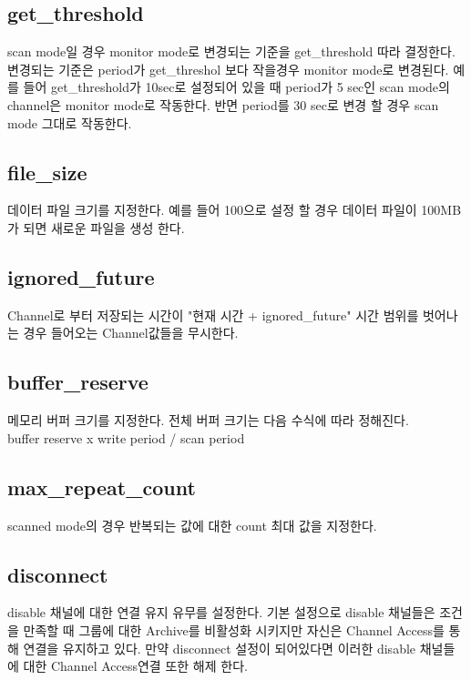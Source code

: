 \documentclass[11pt
  , a4paper
  , article
  , oneside
]{memoir}
\begin{document}
\subsection{get\_threshold}
scan mode일 경우 monitor mode로 변경되는 기준을 get\_threshold 따라 결정한다.
변경되는 기준은 period가 get\_threshol 보다 작을경우 monitor mode로 변경된다.
예를 들어 get\_threshold가 10sec로 설정되어 있을 때 period가 5 sec인 scan mode의 
channel은 monitor mode로 작동한다. 반면 period를 30 sec로 변경 할 경우 scan mode 그대로
작동한다.
\subsection{file\_size}
데이터 파일 크기를 지정한다. 예를 들어 100으로 설정 할 경우 데이터 파일이 100MB가 되면
새로운 파일을 생성 한다.

\subsection{ignored\_future}
Channel로 부터 저장되는 시간이 "현재 시간 + ignored\_future" 시간 범위를 벗어나는 경우
들어오는 Channel값들을 무시한다. 

\subsection{buffer\_reserve}
메모리 버퍼 크기를 지정한다. 전체 버퍼 크기는 다음 수식에 따라 정해진다.\\
\newline
buffer reserve x write period / scan period
\newline

\subsection{max\_repeat\_count}
scanned mode의 경우 반복되는 값에 대한 count 최대 값을 지정한다. 

\subsection{disconnect}
disable 채널에 대한 연결 유지 유무를 설정한다. 기본 설정으로 disable 채널들은
조건을 만족할 때 그룹에 대한 Archive를 비활성화 시키지만 자신은 Channel Access를 통해
연결을 유지하고 있다. 만약 disconnect 설정이 되어있다면 이러한 disable 채널들에 대한
Channel Access연결 또한 해제 한다.
\end{document}
